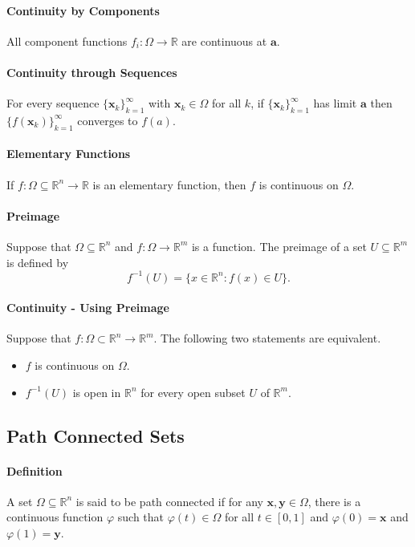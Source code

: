 \paragraph{Continuity by Components} 
All component functions \(f_i: \Omega \rightarrow \mathbb{R}\) are continuous at \(\textbf{a}\).

\paragraph{Continuity through Sequences}
For every sequence \(\{\textbf{x}_k\}_{k=1}^\infty\) with \(\textbf{x}_k \in \Omega\) for all
\(k\), if \(\{\textbf{x}_k\}_{k=1}^\infty\) has limit \(\textbf{a}\) then 
\(\{f(\textbf{x}_k)\}_{k=1}^\infty\) converges to \(f(a)\).

\paragraph{Elementary Functions}
If \(f: \Omega \subseteq \mathbb{R}^n \rightarrow \mathbb{R}\) is an elementary function,
then \(f\) is continuous on \(\Omega\).

\paragraph{Preimage}
Suppose that  \(\Omega \subseteq \mathbb{R}^n\) and  \(f: \Omega \rightarrow \mathbb{R}^m\) 
is a function. The preimage of a set \(U \subseteq \mathbb{R}^m\) is defined by 
\[ f^{-1}(U) = \{ x \in \mathbb{R}^n: f(x) \in U \}.\]

\paragraph{Continuity - Using Preimage} 
Suppose that \(f: \Omega \subset \mathbb{R}^n \rightarrow \mathbb{R}^m\). The following two
statements are equivalent.
\begin{itemize}
    \item \(f\) is continuous on \(\Omega\).
    \item \(f^{-1}(U)\) is open in \(\mathbb{R}^n\) for every open subset \(U\) of \(\mathbb{R}^m\).
\end{itemize}

\subsection{Path Connected Sets}
\paragraph{Definition} A set \(\Omega \subseteq \mathbb{R}^n\) is said to be path connected
if for any \(\textbf{x}, \textbf{y} \in \Omega\), there is a continuous function
\(\varphi\) such that \(\varphi(t) \in \Omega\) for all \(t \in [0, 1]\) and 
\(\varphi(0) = \textbf{x}\) and \(\varphi(1) = \textbf{y}\).

